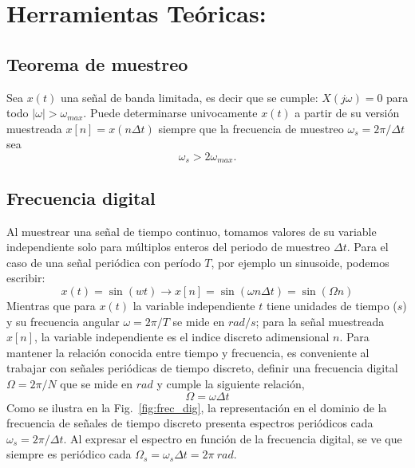 \documentclass[10pt,a4paper]{article}
\begin{document}
\section*{Herramientas Te\'oricas:}
\label{sec:herr}

\subsection*{Teorema de muestreo}
Sea $x(t)$ una señal de banda limitada, es decir que se cumple: $X(j\omega)=0$ para todo $|\omega|>\omega_{max}$. Puede 
determinarse univocamente $x(t)$ a partir de su versión muestreada $x[n]=x(n\Delta t)$ siempre que la frecuencia de 
muestreo $\omega_s=2\pi/\Delta t$ sea 
\begin{equation}\label{eq:teorema_muestreo}
\omega_s>2\omega_{max}.
\end{equation}

\subsection*{Frecuencia digital}

Al muestrear una señal de tiempo continuo, tomamos valores de su variable independiente solo 
para múltiplos enteros del periodo de muestreo $\Delta t$. Para el caso de una señal periódica con período $T$, por 
ejemplo un sinusoide, podemos escribir:
\begin{equation}
x(t)=\sin(wt)\to x[n]=\sin(\omega n\Delta t)=\sin(\Omega n)
\end{equation} 
Mientras que para $x(t)$ la variable independiente $t$ tiene unidades de tiempo ($s$) y su frecuencia angular 
$\omega=2\pi/T$ se mide en $rad/s$; para la señal muestreada $x[n]$, la variable independiente es el indice discreto 
adimensional $n$. Para mantener la relación conocida entre tiempo y frecuencia, es conveniente  al trabajar con señales 
periódicas de tiempo discreto, definir una frecuencia digital $\Omega=2\pi/N$ que se mide en $rad$ y cumple la 
siguiente relación,
\begin{equation}
\Omega=\omega \Delta t
\end{equation} 
Como se ilustra en la Fig.~\ref{fig:frec_dig}, la representación en el dominio de la frecuencia de señales de 
tiempo discreto presenta espectros periódicos cada $\omega_s=2\pi/\Delta t$. Al expresar el espectro en función de la 
frecuencia digital, se ve que siempre es periódico cada  $\Omega_{s}=\omega_{s}\Delta t=2\pi~rad$. 
\end{document}
